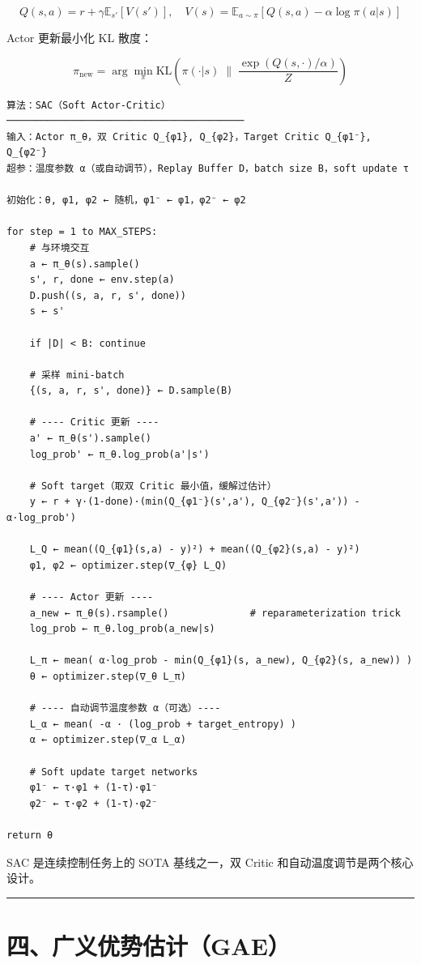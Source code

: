 \[
Q(s, a) = r + \gamma \mathbb{E}_{s'}\left[V(s')\right], \quad V(s) = \mathbb{E}_{a \sim \pi}\left[Q(s,a) - \alpha \log \pi(a|s)\right]
\]

Actor 更新最小化 KL 散度：

\[
\pi_\mathrm{new} = \arg\min_\pi \mathrm{KL}\!\left(\pi(\cdot|s) \;\Big\|\; \frac{\exp(Q(s,\cdot)/\alpha)}{Z}\right)
\]

\begin{verbatim}
算法：SAC（Soft Actor-Critic）
─────────────────────────────────────────
输入：Actor π_θ，双 Critic Q_{φ1}, Q_{φ2}，Target Critic Q_{φ1⁻}, Q_{φ2⁻}
超参：温度参数 α（或自动调节），Replay Buffer D，batch size B，soft update τ

初始化：θ, φ1, φ2 ← 随机，φ1⁻ ← φ1，φ2⁻ ← φ2

for step = 1 to MAX_STEPS:
    # 与环境交互
    a ← π_θ(s).sample()
    s', r, done ← env.step(a)
    D.push((s, a, r, s', done))
    s ← s'
    
    if |D| < B: continue
    
    # 采样 mini-batch
    {(s, a, r, s', done)} ← D.sample(B)
    
    # ---- Critic 更新 ----
    a' ← π_θ(s').sample()
    log_prob' ← π_θ.log_prob(a'|s')
    
    # Soft target（取双 Critic 最小值，缓解过估计）
    y ← r + γ·(1-done)·(min(Q_{φ1⁻}(s',a'), Q_{φ2⁻}(s',a')) - α·log_prob')
    
    L_Q ← mean((Q_{φ1}(s,a) - y)²) + mean((Q_{φ2}(s,a) - y)²)
    φ1, φ2 ← optimizer.step(∇_{φ} L_Q)
    
    # ---- Actor 更新 ----
    a_new ← π_θ(s).rsample()              # reparameterization trick
    log_prob ← π_θ.log_prob(a_new|s)
    
    L_π ← mean( α·log_prob - min(Q_{φ1}(s, a_new), Q_{φ2}(s, a_new)) )
    θ ← optimizer.step(∇_θ L_π)
    
    # ---- 自动调节温度参数 α（可选）----
    L_α ← mean( -α · (log_prob + target_entropy) )
    α ← optimizer.step(∇_α L_α)
    
    # Soft update target networks
    φ1⁻ ← τ·φ1 + (1-τ)·φ1⁻
    φ2⁻ ← τ·φ2 + (1-τ)·φ2⁻

return θ
\end{verbatim}

SAC 是连续控制任务上的 SOTA 基线之一，双 Critic 和自动温度调节是两个核心设计。

\hrule

\section{四、广义优势估计（GAE）}

